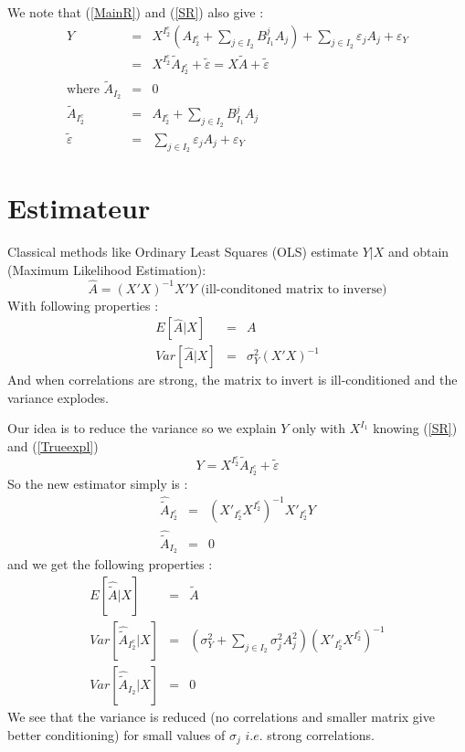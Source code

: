 \documentclass[12pt]{article}
\begin{document}
We note that (\ref{MainR}) and (\ref{SR}) also give :
\begin{eqnarray}
	Y&=&X^{I_2^c} (A_{I_2^c}+ \sum_{j \in I_2}B^{j}_{I_1}A_{j})+  \sum_{j \in I_2}\varepsilon_{j}A_{j}+\varepsilon_Y \\
					&=& X^{I_2^c}\tilde{A}_{I_2^c}+ \tilde{\varepsilon}=X\tilde{A}+ \tilde{\varepsilon}\label{Trueexpl} \\
			\textrm{where }		\tilde{A}_{I_2}&=&0 \\
					\tilde{A}_{I_2^c}&=&A_{I_2^c}+ \sum_{j \in I_2}B^{j}_{I_1}A_{j} \\
					\tilde{\varepsilon}&=&\sum_{j \in I_2}\varepsilon_{j}A_{j}+\varepsilon_Y 
\end{eqnarray}
\section{Estimateur}
	Classical methods like Ordinary Least Squares (OLS) estimate $Y|X$ and obtain (Maximum Likelihood Estimation): 
		\begin{equation}
			\hat A = (X'X)^{-1}X'Y \textrm{ (ill-conditoned matrix to inverse)}
		\end{equation}
		With following properties :
		\begin{eqnarray}
			E[\hat{A}|X]&=&A \\
			Var[\hat{A}|X]&=& \sigma_Y^2(X'X)^{-1}
		\end{eqnarray}				
		And when correlations are strong, the matrix to invert is ill-conditioned and the variance explodes.
 			
		Our idea is to reduce the variance so we explain $Y$ only with $X^{I_1}$ knowing (\ref{SR}) and (\ref{Trueexpl})
			\begin{equation}
				Y= X^{I_2^c}\tilde{A}_{I_2^c}+ \tilde{\varepsilon}\label{explicatif}
			\end{equation}							
		So the new estimator simply is : 
		\begin{eqnarray}
			\hat{\tilde{A}}_{I_2^c} &=& (X'_{I_2^c} X^{I_2^c})^{-1}X'_{I_2^c}Y \\
			\hat{\tilde{A}}_{I_2} &=& 0
		\end{eqnarray}
		and we get the following properties :
		\begin{eqnarray}
			E[\hat{\tilde{A}}|X]&=&\tilde{A} \\
			Var[\hat{\tilde{A}}_{I_2^c}|X]&=& (\sigma^2_Y+\sum_{j \in I_2}\sigma^2_{j}A_{j}^2 )(X'_{I_2^c} X^{I_2^c})^{-1} \\
			Var[\hat{\tilde{A}}_{I_2}|X]&=& 0 
		\end{eqnarray}
		We see that the variance is reduced (no correlations and smaller matrix give better conditioning) for small values of $\sigma_j$ $i.e.$ strong correlations.					
		
\end{document}
